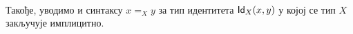 \begin{code}%
\>[0]\AgdaSpace{}%
\AgdaSpace{}%
\AgdaSymbol{\{}\AgdaSymbol{\}}\AgdaSpace{}%
\AgdaSymbol{(}\AgdaSpace{}%
\AgdaSymbol{:}\AgdaSpace{}%
\AgdaSpace{}%
\AgdaSpace{}%
\AgdaSymbol{)}\AgdaSpace{}%
\AgdaSymbol{:}\AgdaSpace{}%
\AgdaSpace{}%
\AgdaSpace{}%
\AgdaSpace{}%
\AgdaSpace{}%
\AgdaSpace{}%
\AgdaSpace{}%
\<%
\\
\>[0][@{}l@{\AgdaIndent{0}}]%
\>[4]\AgdaSpace{}%
\AgdaSymbol{:}\AgdaSpace{}%
\AgdaSymbol{(}\AgdaSpace{}%
\AgdaSymbol{:}\AgdaSpace{}%
\AgdaSymbol{)}\AgdaSpace{}%
\AgdaSpace{}%
\AgdaSpace{}%
\AgdaSpace{}%
\AgdaSpace{}%
\<%
\end{code}

Такође, уводимо и синтаксу $x =_X y$ за тип идентитета $\mathsf{Id}_{X}(x, y)$ у којој се тип $X$ закључује имплицитно. 
\begin{code}%
\>[0]\AgdaSpace{}%
\AgdaSpace{}%
\AgdaOperator{\AgdaFunction{\AgdaUnderscore{}==\AgdaUnderscore{}}}\<%
\\
%
\\[\AgdaEmptyExtraSkip]%
\>[0]\AgdaOperator{\AgdaFunction{\AgdaUnderscore{}==\AgdaUnderscore{}}}\AgdaSpace{}%
\AgdaSymbol{:}\AgdaSpace{}%
\AgdaSymbol{\{}\AgdaSpace{}%
\AgdaSymbol{:}\AgdaSpace{}%
\AgdaSpace{}%
\AgdaSpace{}%
\AgdaSymbol{\}}\AgdaSpace{}%
\AgdaSpace{}%
\AgdaSpace{}%
\AgdaSpace{}%
\AgdaSpace{}%
\AgdaSpace{}%
\AgdaSpace{}%
\<%
\\
\>[0]\AgdaSpace{}%
\AgdaOperator{\AgdaFunction{==}}\AgdaSpace{}%
\AgdaSpace{}%
\AgdaSymbol{=}\AgdaSpace{}%
\AgdaSpace{}%
\AgdaSymbol{\AgdaUnderscore{}}\AgdaSpace{}%
\AgdaSpace{}%
\<%
\end{code}

